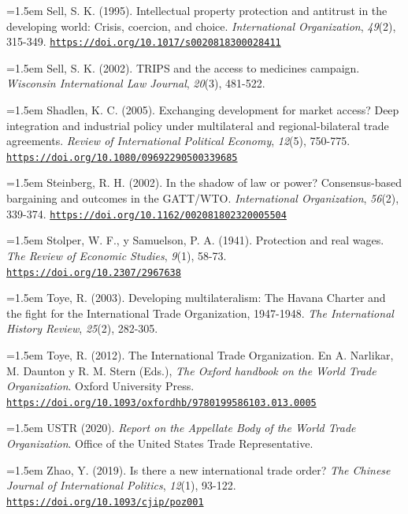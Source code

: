 \documentclass[10pt,a4paper]{article}
\begin{document}
\noindent\hangindent=1.5em Sell, S. K. (1995). Intellectual property protection and antitrust in the developing world: Crisis, coercion, and choice. \textit{International Organization}, \textit{49}(2), 315-349. \href{https://doi.org/10.1017/s0020818300028411}{\nolinkurl{https://doi.org/10.1017/s0020818300028411}}

\noindent\hangindent=1.5em Sell, S. K. (2002). TRIPS and the access to medicines campaign. \textit{Wisconsin International Law Journal}, \textit{20}(3), 481-522.

\noindent\hangindent=1.5em Shadlen, K. C. (2005). Exchanging development for market access? Deep integration and industrial policy under multilateral and regional-bilateral trade agreements. \textit{Review of International Political Economy}, \textit{12}(5), 750-775. \href{https://doi.org/10.1080/09692290500339685}{\nolinkurl{https://doi.org/10.1080/09692290500339685}}

\noindent\hangindent=1.5em Steinberg, R. H. (2002). In the shadow of law or power? Consensus-based bargaining and outcomes in the GATT/WTO. \textit{International Organization}, \textit{56}(2), 339-374. \href{https://doi.org/10.1162/002081802320005504}{\nolinkurl{https://doi.org/10.1162/002081802320005504}}

\noindent\hangindent=1.5em Stolper, W. F., y Samuelson, P. A. (1941). Protection and real wages. \textit{The Review of Economic Studies}, \textit{9}(1), 58-73. \href{https://doi.org/10.2307/2967638}{\nolinkurl{https://doi.org/10.2307/2967638}}

\noindent\hangindent=1.5em Toye, R. (2003). Developing multilateralism: The Havana Charter and the fight for the International Trade Organization, 1947-1948. \textit{The International History Review}, \textit{25}(2), 282-305.

\noindent\hangindent=1.5em Toye, R. (2012). The International Trade Organization. En A. Narlikar, M. Daunton y R. M. Stern (Eds.), \textit{The Oxford handbook on the World Trade Organization}. Oxford University Press. \href{https://doi.org/10.1093/oxfordhb/9780199586103.013.0005}{\nolinkurl{https://doi.org/10.1093/oxfordhb/9780199586103.013.0005}}

\noindent\hangindent=1.5em USTR (2020). \textit{Report on the Appellate Body of the World Trade Organization}. Office of the United States Trade Representative.

\noindent\hangindent=1.5em Zhao, Y. (2019). Is there a new international trade order? \textit{The Chinese Journal of International Politics}, \textit{12}(1), 93-122. \href{https://doi.org/10.1093/cjip/poz001}{\nolinkurl{https://doi.org/10.1093/cjip/poz001}}
\end{document}
